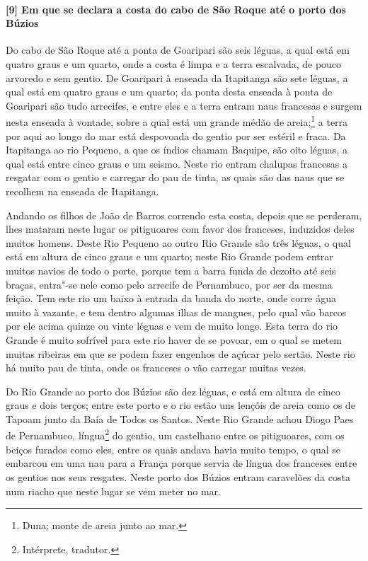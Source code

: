 \begin{linenumbers}
\paragraph{[9] Em que se declara a costa do cabo de São Roque até o porto dos Búzios} \quad
Do cabo de São Roque até a ponta de Goaripari são seis léguas, a qual está em quatro graus
e um quarto, onde a costa é limpa e a terra escalvada, de pouco arvoredo e sem gentio. De
Goaripari à enseada da Itapitanga são sete léguas, a qual está em quatro graus e um
quarto; da ponta desta enseada à ponta de Goaripari são tudo arrecifes, e entre eles e a
terra entram naus francesas e surgem nesta enseada à vontade, sobre a qual está um grande
médão de areia;\footnote{ Duna; monte de areia junto ao mar.} a terra por aqui ao longo do mar
está despovoada do gentio por ser estéril e fraca. Da Itapitanga ao rio Pequeno, a que os
índios chamam Baquipe, são oito léguas, a qual está entre cinco graus e um seismo. Neste
rio entram chalupas francesas a resgatar com o gentio e carregar do pau de tinta, as quais
são das naus que se recolhem na enseada de Itapitanga.

Andando os filhos de João de Barros correndo esta costa, depois que se perderam, lhes
mataram neste lugar os pitiguoares com favor dos franceses, induzidos deles muitos homens.
Deste Rio Pequeno ao outro Rio Grande são três léguas, o qual está em altura de cinco
graus e um quarto; neste Rio Grande podem entrar muitos navios de todo o porte, porque tem
a barra funda de dezoito até seis braças, entra"-se nele como pelo arrecife de Pernambuco,
por ser da mesma feição. Tem este rio um baixo à entrada da banda do norte, onde corre
água muito à vazante, e tem dentro algumas ilhas de mangues, pelo qual vão barcos por ele
acima quinze ou vinte léguas e vem de muito longe. Esta terra do rio Grande é muito
sofrível para este rio haver de se povoar, em o qual se metem muitas ribeiras em que se
podem fazer engenhos de açúcar pelo sertão. Neste rio há muito pau de tinta, onde os
franceses o vão carregar muitas vezes.

Do Rio Grande ao porto dos Búzios são dez léguas, e está em altura de cinco graus e dois
terços; entre este porto e o rio estão uns lençóis de areia como os de Tapoam junto da
Baía de Todos os Santos. Neste Rio Grande achou Diogo Paes de Pernambuco, língua\footnote{ 
Intérprete, tradutor.} do gentio, um castelhano entre os pitiguoares, com os beiços
furados como eles, entre os quais andava havia muito tempo, o qual se embarcou em uma nau
para a França porque servia de língua dos franceses entre os gentios nos seus resgates.
Neste porto dos Búzios entram caravelões da costa num riacho que neste lugar se vem meter
no mar.


\end{linenumbers}
